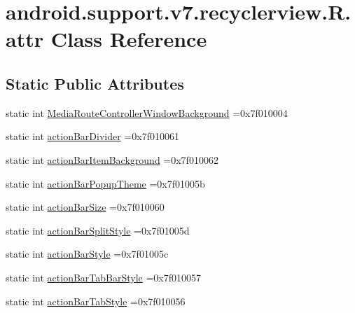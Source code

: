\hypertarget{classandroid_1_1support_1_1v7_1_1recyclerview_1_1R_1_1attr}{}\section{android.\+support.\+v7.\+recyclerview.\+R.\+attr Class Reference}
\label{classandroid_1_1support_1_1v7_1_1recyclerview_1_1R_1_1attr}
\subsection*{Static Public Attributes}
\begin{DoxyCompactItemize}
\item 
static int \hyperlink{classandroid_1_1support_1_1v7_1_1recyclerview_1_1R_1_1attr_a48eda54016fc8ca8e489ddc6c254d445}{Media\+Route\+Controller\+Window\+Background} =0x7f010004
\item 
static int \hyperlink{classandroid_1_1support_1_1v7_1_1recyclerview_1_1R_1_1attr_a73ed8c96e546616907597658c4171684}{action\+Bar\+Divider} =0x7f010061
\item 
static int \hyperlink{classandroid_1_1support_1_1v7_1_1recyclerview_1_1R_1_1attr_a406fd2429683cd4b5d928c3630add1ae}{action\+Bar\+Item\+Background} =0x7f010062
\item 
static int \hyperlink{classandroid_1_1support_1_1v7_1_1recyclerview_1_1R_1_1attr_ad72ccd341f4d93e155e71cf654f5e7a4}{action\+Bar\+Popup\+Theme} =0x7f01005b
\item 
static int \hyperlink{classandroid_1_1support_1_1v7_1_1recyclerview_1_1R_1_1attr_ab6e3a55db3c5f1c2f85fde80a7a441d7}{action\+Bar\+Size} =0x7f010060
\item 
static int \hyperlink{classandroid_1_1support_1_1v7_1_1recyclerview_1_1R_1_1attr_a3a63f09edf217b4865f1059eea44eb80}{action\+Bar\+Split\+Style} =0x7f01005d
\item 
static int \hyperlink{classandroid_1_1support_1_1v7_1_1recyclerview_1_1R_1_1attr_ae08f36b1a7c8e2339e209e784c7abeb9}{action\+Bar\+Style} =0x7f01005c
\item 
static int \hyperlink{classandroid_1_1support_1_1v7_1_1recyclerview_1_1R_1_1attr_a19c7f25731e63cd379980120784bea76}{action\+Bar\+Tab\+Bar\+Style} =0x7f010057
\item 
static int \hyperlink{classandroid_1_1support_1_1v7_1_1recyclerview_1_1R_1_1attr_a564d086d22e53a75d6ce3758856bc892}{action\+Bar\+Tab\+Style} =0x7f010056
\item 

\end{DoxyCompactItemize}
